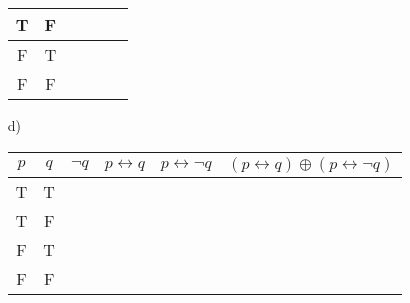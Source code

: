\begin{itemize}
\begin{minipage}[t]{\linewidth}
\begin{tabular}{ |c|c|c|c|c|c| }
                T & F &  &  &  &  \\
                \hline
                F & T &  &  &  &  \\
                \hline
                F & F &  &  &  &  \\
                \hline
            \end{tabular}
        \end{minipage}
    \item[d)]
        \begin{minipage}[t]{\linewidth}
            \renewcommand{\arraystretch}{1.5} 
            \setlength{\tabcolsep}{12pt} 
            \begin{tabular}{ |c|c|c|c|c|c| } 
                \hline
                $p$ & $q$ & $\neg q$ & $p \leftrightarrow q$ & $p \leftrightarrow \neg q$ & $(p \leftrightarrow q)\oplus (p \leftrightarrow \neg q)$\\
                \hline
                T & T &  &  &  &  \\ 
                \hline
                T & F &  &  &  &  \\
                \hline
                F & T &  &  &  &  \\
                \hline
                F & F &  &  &  &  \\
                \hline
            \end{tabular}
        \end{minipage}
\end{itemize}